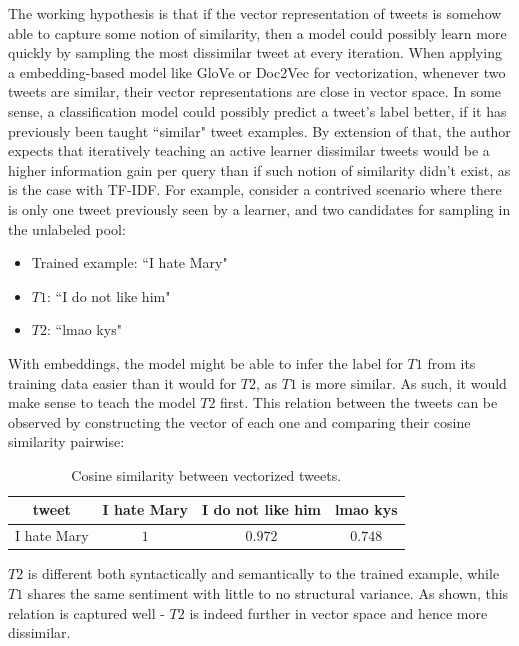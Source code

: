 \documentclass[a4paper,12pt]{article}
\begin{document}
The working hypothesis is that if the vector representation of tweets is somehow able to capture some notion of similarity, then a model could possibly learn more quickly by sampling the most dissimilar tweet at every iteration. When applying a embedding-based model like GloVe or Doc2Vec for vectorization, whenever two tweets are similar, their vector representations are close in vector space. In some sense, a classification model could possibly predict a tweet's label better, if it has previously been taught ``similar" tweet examples. By extension of that, the author expects that iteratively teaching an active learner dissimilar tweets would be a higher information gain per query than if such notion of similarity didn't exist, as is the case with TF-IDF. For example, consider a contrived scenario where there is only one tweet previously seen by a learner, and two candidates for sampling in the unlabeled pool:
\begin{itemize}
    \item Trained example: ``I hate Mary"
    \item $T1$: ``I do not like him"
    \item $T2$: ``lmao kys"
\end{itemize}
With embeddings, the model might be able to infer the label for $T1$ from its training data easier than it would for $T2$, as $T1$ is more similar. As such, it would make sense to teach the model $T2$ first. This relation between the tweets can be observed by constructing the vector of each one and comparing their cosine similarity pairwise:
\begin{table}[H]
\centering
\begin{tabular}{|l|l|l|l|}
\hline
\multicolumn{1}{|c|}{tweet} & I hate Mary            & I do not like him          & lmao kys                   \\ \hline
I hate Mary                 & \multicolumn{1}{c|}{$1$} & \multicolumn{1}{c|}{$0.972$} & \multicolumn{1}{c|}{$0.748$} \\ \hline
\end{tabular}
\captionsetup{justification=centering}
\caption{\label{tab:cosineSim}Cosine similarity between vectorized tweets.}
\end{table}
$T2$ is different both syntactically and semantically to the trained example, while $T1$ shares the same sentiment with little to no structural variance. As shown, this relation is captured well - $T2$ is indeed further in vector space and hence more dissimilar.
\end{document}
